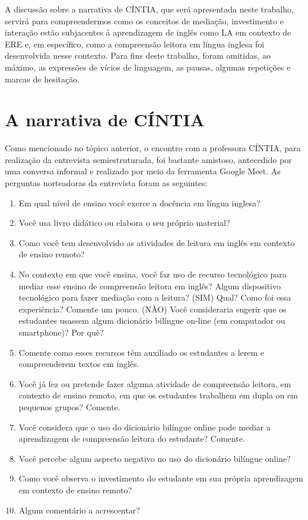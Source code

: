 \documentclass{textolivre}
\begin{document}
A discussão sobre a narrativa de CÍNTIA, que será apresentada neste trabalho, servirá para compreendermos como os conceitos de mediação, investimento e interação estão subjacentes à aprendizagem de inglês como LA em contexto de ERE e, em específico, como a compreensão leitora em língua inglesa foi desenvolvida nesse contexto. Para fins deste trabalho, foram omitidas, ao máximo, as expressões de vícios de linguagem, as pausas, algumas repetições e marcas de hesitação.

\section{A narrativa de CÍNTIA}
Como mencionado no tópico anterior, o encontro com a professora CÍNTIA, para realização da entrevista semiestruturada, foi bastante amistoso, antecedido por uma conversa informal e realizado por meio da ferramenta Google Meet. As perguntas norteadoras da entrevista foram as seguintes:

\begin{enumerate}
\item Em qual nível de ensino você exerce a docência em língua inglesa?
\item Você usa livro didático ou elabora o seu próprio material?
\item Como você tem desenvolvido as atividades de leitura em inglês em contexto de ensino remoto?
\item No contexto em que você ensina, você faz uso de recurso tecnológico para mediar esse ensino de compreensão leitora em inglês? Algum dispositivo tecnológico para fazer mediação com a leitura?
(SIM) Qual? Como foi essa experiência? Comente um pouco.
(NÃO) Você consideraria sugerir que os estudantes usassem algum dicionário bilíngue on-line (em computador ou smartphone)? Por quê?
\item Comente como esses recursos têm auxiliado os estudantes a lerem e compreenderem textos em inglês.
\item Você já fez ou pretende fazer alguma atividade de compreensão leitora, em contexto de ensino remoto, em que os estudantes trabalhem em dupla ou em pequenos grupos? Comente.
\item Você considera que o uso do dicionário bilíngue online pode mediar a aprendizagem de compreensão leitora do estudante? Comente.
\item Você percebe algum aspecto negativo no uso do dicionário bilíngue online?
\item Como você observa o investimento do estudante em sua própria aprendizagem em contexto de ensino remoto?
\item Algum comentário a acrescentar?
\end{enumerate}
\end{document}
